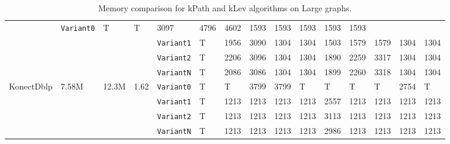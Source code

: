 \begin{table}[h!]
{\begin{tabular}{ |p{1.6cm}|p{0.9cm}|p{0.9cm}|p{0.8cm} |p{1.3cm}|p{.8cm}| p{.8cm}|p{.8cm}|p{.8cm}|p{.8cm}|p{.8cm}| p{.8cm}|p{.8cm}|p{.8cm}|p{.8cm}| }
& \texttt{Variant0} & T & T & 3097 & 4796 & 4602& 1593 & 1593 & 1593 & 1593 & 1593\\
& & &  & \texttt{Variant1} & T & 1956 & 3090 & 1304 & 1304& 1503 & 1579 & 1579 & 1304 & 1304\\
& & &  & \texttt{Variant2} & T & 2206 & 3096 & 1304 & 1304& 1890 & 2259 & 3317 & 1304 & 1304\\
& & &  & \texttt{VariantN} & T & 2086 & 3086 & 1304 & 1304& 1899 & 2260 & 3318 & 1304 & 1304\\
\hline
\multirow{4}{*}{KonectDblp} & \multirow{4}{*}{7.58M} & \multirow{4}{*}{12.3M} & \multirow{4}{*}{1.62}
& \texttt{Variant0} & T & T & 3799 & 3799 & T& T & T & T & 2754 & T\\
& & &  & \texttt{Variant1} & T & 1213 & 1213 & 1213 & 1213& 2557 & 1213 & 1213 & 1213 & 1213\\
& & &  & \texttt{Variant2} & T & 1213 & 1213 & 1213 & 1213& 3113 & 1213 & 1213 & 1213 & 1213\\
& & &  & \texttt{VariantN} & T & 1213 & 1213 & 1213 & 1213& 2986 & 1213 & 1213 & 1213 & 1213\\
\hline
\end{tabular}}
\caption{Memory comparison for kPath and kLev algorithms on Large graphs.}
\label{label}
\end{table}
